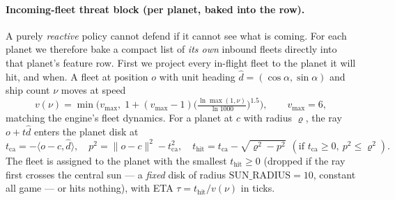\documentclass[11pt]{article}
\begin{document}
\paragraph{Incoming-fleet threat block (per planet, baked into the row).}\label{sec:threat}
A purely \emph{reactive} policy cannot defend if it cannot see what is coming. For each planet we
therefore bake a compact list of \emph{its own} inbound fleets directly into that planet's feature
row. First we project every in-flight fleet to the planet it will hit, and when. A fleet at
position $o$ with unit heading $\hat d=(\cos\alpha,\sin\alpha)$ and ship count $\nu$ moves at speed
\begin{equation}
v(\nu)=\min\!\Big(v_{\max},\; 1+(v_{\max}-1)\big(\tfrac{\ln \max(1,\nu)}{\ln 1000}\big)^{1.5}\Big),
\qquad v_{\max}=6,
\end{equation}
matching the engine's fleet dynamics. For a planet at $c$ with radius $\varrho$, the ray
$o+t\hat d$ enters the planet disk at
\begin{equation}
t_{\mathrm{ca}} = -\langle o-c,\hat d\rangle,\quad
p^2 = \lVert o-c\rVert^2 - t_{\mathrm{ca}}^2,\quad
t_{\mathrm{hit}} = t_{\mathrm{ca}} - \sqrt{\varrho^2-p^2}\ \ (\text{if } t_{\mathrm{ca}}\!\geq\!0,\ p^2\!\leq\!\varrho^2).
\end{equation}
The fleet is assigned to the planet with the smallest $t_{\mathrm{hit}}\!\geq\!0$ (dropped if the
ray first crosses the central sun --- a \emph{fixed} disk of radius $\mathrm{SUN\_RADIUS}=10$,
constant all game --- or hits nothing), with ETA $\tau=t_{\mathrm{hit}}/v(\nu)$ in ticks.
\end{document}

